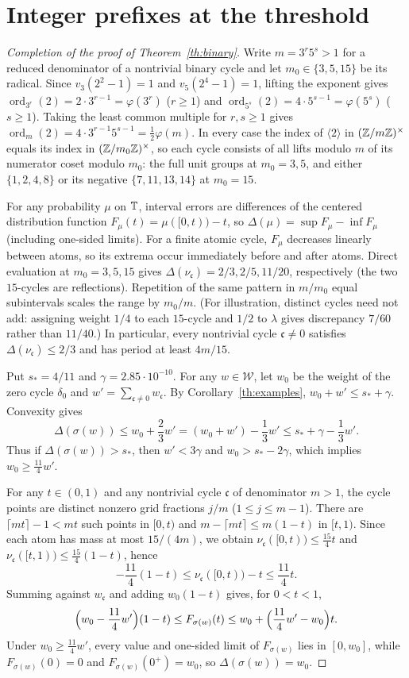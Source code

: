 \documentclass[11pt]{article}
\begin{document}
\section{Integer prefixes at the threshold}\label{sec:threshold}
\begin{proof}[Completion of the proof of Theorem~\ref{th:binary}]
Write $m=3^r5^s>1$ for a reduced denominator of a nontrivial binary cycle and let $m_0\in\{3,5,15\}$ be its radical. Since $v_3(2^2-1)=1$ and $v_5(2^4-1)=1$, lifting the exponent gives $\operatorname{ord}_{3^r}(2)=2\cdot3^{r-1}=\varphi(3^r)$ ($r\ge1$) and $\operatorname{ord}_{5^s}(2)=4\cdot5^{s-1}=\varphi(5^s)$ ($s\ge1$). Taking the least common multiple for $r,s\ge1$ gives $\operatorname{ord}_m(2)=4\cdot3^{r-1}5^{s-1}=\frac12\varphi(m)$. In every case the index of $\langle2\rangle$ in $(\mathbb Z/m\mathbb Z)^\times$ equals its index in $(\mathbb Z/m_0\mathbb Z)^\times$, so each cycle consists of all lifts modulo $m$ of its numerator coset modulo $m_0$: the full unit groups at $m_0=3,5$, and either $\{1,2,4,8\}$ or its negative $\{7,11,13,14\}$ at $m_0=15$.

For any probability $\mu$ on $\mathbb T$, interval errors are differences of the centered distribution function $F_\mu(t)=\mu([0,t))-t$, so $\Delta(\mu)=\sup F_\mu-\inf F_\mu$ (including one-sided limits). For a finite atomic cycle, $F_\mu$ decreases linearly between atoms, so its extrema occur immediately before and after atoms. Direct evaluation at $m_0=3,5,15$ gives $\Delta(\nu_{\mathfrak c})=2/3,2/5,11/20$, respectively (the two $15$-cycles are reflections). Repetition of the same pattern in $m/m_0$ equal subintervals scales the range by $m_0/m$. (For illustration, distinct cycles need not add: assigning weight $1/4$ to each $15$-cycle and $1/2$ to $\lambda$ gives discrepancy $7/60$ rather than $11/40$.) In particular, every nontrivial cycle $\mathfrak c\ne0$ satisfies $\Delta(\nu_{\mathfrak c})\le2/3$ and has period at least $4m/15$.

Put $s_*=4/11$ and $\gamma=2.85\cdot10^{-10}$. For any $w\in\mathcal W$, let $w_0$ be the weight of the zero cycle $\delta_0$ and $w'=\sum_{\mathfrak c\ne0} w_{\mathfrak c}$. By Corollary~\ref{th:examples}, $w_0+w'\le s_*+\gamma$. Convexity gives
\[
 \Delta(\sigma(w))\le w_0+\frac23 w'=(w_0+w')-\frac13 w'\le s_*+\gamma-\frac13 w'.
\]
Thus if $\Delta(\sigma(w))>s_*$, then $w'<3\gamma$ and $w_0>s_*-2\gamma$, which implies $w_0\ge\frac{11}4 w'$.

For any $t\in(0,1)$ and any nontrivial cycle $\mathfrak c$ of denominator $m>1$, the cycle points are distinct nonzero grid fractions $j/m$ ($1\le j\le m-1$). There are $\lceil mt\rceil-1<mt$ such points in $[0,t)$ and $m-\lceil mt\rceil\le m(1-t)$ in $[t,1)$. Since each atom has mass at most $15/(4m)$, we obtain $\nu_{\mathfrak c}([0,t))\le\frac{15}{4}t$ and $\nu_{\mathfrak c}([t,1))\le\frac{15}{4}(1-t)$, hence
\[
 -\frac{11}4(1-t)\le \nu_{\mathfrak c}([0,t))-t\le \frac{11}4 t.
\]
Summing against $w_{\mathfrak c}$ and adding $w_0(1-t)$ gives, for $0<t<1$,
\[
 \Bigl(w_0-\frac{11}4 w'\Bigr)(1-t)\le F_{\sigma(w)}(t)\le w_0+\Bigl(\frac{11}4 w'-w_0\Bigr)t.
\]
Under $w_0\ge\frac{11}4 w'$, every value and one-sided limit of $F_{\sigma(w)}$ lies in $[0,w_0]$, while $F_{\sigma(w)}(0)=0$ and $F_{\sigma(w)}(0^+)=w_0$, so $\Delta(\sigma(w))=w_0$.


\end{proof}
\end{document}
